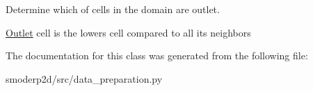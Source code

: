 Determine which of cells in the domain are outlet. 

\hyperlink{classsmoderp2d_1_1src_1_1data__preparation_1_1Outlet}{Outlet} cell is the lowers cell compared to all its neighbors 

The documentation for this class was generated from the following file\-:\begin{DoxyCompactItemize}
\item 
smoderp2d/src/data\-\_\-preparation.\-py\end{DoxyCompactItemize}
